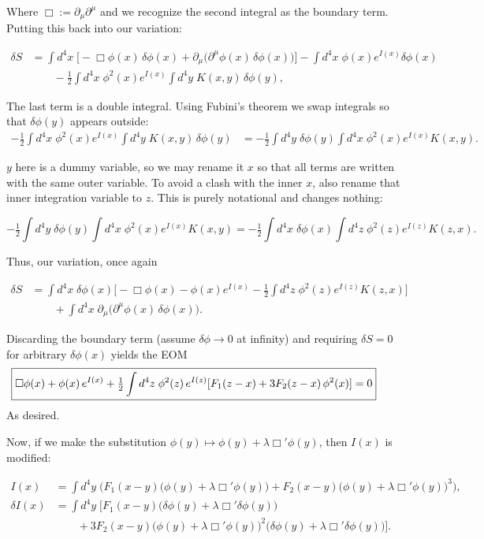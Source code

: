 \documentclass[12pt]{article}
\newcommand{\delmu}{\partial_{\mu}}
\newcommand{\delMu}{\partial^{\mu}}
\begin{document}
Where $\Box := \delmu\delMu$ and we recognize the second integral as the boundary
term. Putting this back into our variation:

\begin{align*}
\delta S
&= \int d^4x\;\bigg[-\Box\phi(x)\,\delta\phi(x)
   + \partial_\mu\!\big(\partial^\mu\phi(x)\,\delta\phi(x)\big)\bigg]
   -\int d^4x\;\phi(x)e^{I(x)}\delta\phi(x) \\
&\qquad -\tfrac{1}{2}\int d^4x\;\phi^2(x)e^{I(x)}
   \int d^4y\;K(x,y)\,\delta\phi(y),
\end{align*}

The last term is a double integral. Using Fubini's theorem we swap integrals so
that $\delta\phi(y)$ appears outside:
\[
\begin{split}
- \tfrac{1}{2}\int d^4x\;\phi^2(x)e^{I(x)}\int d^4y\;K(x,y)\,\delta\phi(y)
&= -\tfrac{1}{2}\int d^4y\;\delta\phi(y)\int d^4x\;\phi^2(x)e^{I(x)}K(x,y).
\end{split}
\]

$y$ here is a dummy variable, so we may rename it $x$ so that
all terms are written with the same outer variable. To avoid a clash with the
inner $x$, also rename that inner integration variable to $z$. This is purely
notational and changes nothing:

\[
- \tfrac{1}{2}\int d^4y\;\delta\phi(y)\int d^4x\;\phi^2(x)e^{I(x)}K(x,y)
= - \tfrac{1}{2}\int d^4x\;\delta\phi(x)\int d^4z\;\phi^2(z)e^{I(z)}K(z,x).
\]

Thus, our variation, once again

\[
\begin{split}
\delta S
&= \int d^4x\;\delta\phi(x)\Big[-\Box\phi(x)-\phi(x)e^{I(x)}
   -\tfrac{1}{2}\int d^4z\;\phi^2(z)e^{I(z)}K(z,x)\Big] \\
&\qquad + \int d^4x\;\partial_\mu\!\big(\partial^\mu\phi(x)\,\delta\phi(x)\big).
\end{split}
\]

Discarding the boundary term (assume $\delta\phi\to0$ at infinity) and
requiring $\delta S=0$ for arbitrary $\delta\phi(x)$ yields the EOM
\[
\boxed{%
\Box\phi(x)
+\phi(x)\,e^{I(x)}
+\tfrac{1}{2}\int d^4z\;\phi^2(z)\,e^{I(z)}[F_1(z-x)+3F_2(z-x)\,\phi^2(x)]
=0}
\qquad
\]
As desired.

Now, if we make the substitution $\phi(y) \mapsto \phi(y) + \lambda \Box' \phi(y)$, then $I(x)$ is modified:

\begin{align*}
I(x) &= \int d^4y \; \Big( F_1(x-y)\big(\phi(y) + \lambda \Box' \phi(y)\big) 
+ F_2(x-y) \big(\phi(y) + \lambda \Box' \phi(y)\big)^3 \Big), \\
\delta I(x) &= \int d^4y \; \Big[ F_1(x-y)\big(\delta\phi(y) + \lambda \Box' \delta\phi(y)\big) \\
&\qquad + 3 F_2(x-y) \big(\phi(y) + \lambda \Box' \phi(y)\big)^2 \big(\delta\phi(y) + \lambda \Box' \delta\phi(y)\big) \Big].
\end{align*}
\end{document}
